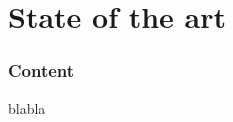\part{State of the art}
\nopagebreak
\section*{Content}
blabla
\afterpage{\blankpage}
\newpage

\afterpage{\blankpage}
\newpage